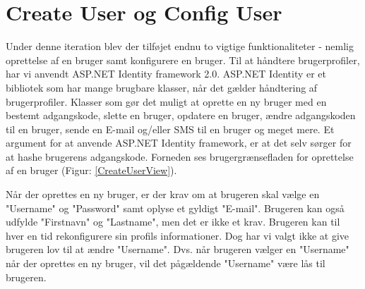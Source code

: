 \section{Create User og Config User}

Under denne iteration blev der tilføjet endnu to vigtige funktionaliteter - nemlig oprettelse af en bruger samt konfigurere en bruger. Til at håndtere brugerprofiler, har vi anvendt ASP.NET Identity framework 2.0. ASP.NET Identity er et bibliotek som har mange brugbare klasser, når det gælder håndtering af brugerprofiler. Klasser som gør det muligt at oprette en ny bruger med en bestemt adgangskode, slette en bruger, opdatere en bruger, ændre adgangskoden til en bruger, sende en E-mail og/eller SMS til en bruger og meget mere. Et argument for at anvende ASP.NET Identity framework, er at det selv sørger for at hashe brugerens adgangskode. 
Forneden ses brugergrænsefladen for oprettelse af en bruger (Figur: \ref{CreateUserView}). 


Når der oprettes en ny bruger, er der krav om at brugeren skal vælge en "Username" og "Password" samt oplyse et gyldigt "E-mail". Brugeren kan også udfylde "Firstnavn" og "Lastname", men det er ikke et krav. Brugeren kan til hver en tid rekonfigurere sin profils informationer. Dog har vi valgt ikke at give brugeren lov til at ændre "Username". Dvs. når brugeren vælger en "Username" når der oprettes en ny bruger, vil det pågældende "Username" være lås til brugeren. 
